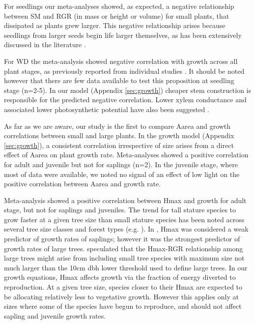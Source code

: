\documentclass[a4paper,11pt]{article}
\begin{document}
For seedlings our meta-analyses showed, as expected, a negative relationship between SM and RGR (in mass or height or volume) for small plants, that dissipated as plants grew larger. This negative relationship arises because seedlings from larger seeds begin life larger themselves, as has been extensively discussed in the literature \citep[reviewed by][]{Turnbull:2012ew}. 

For WD the meta-analysis showed negative correlation with growth across all plant stages, as previously reported from individual studies \citep{Wright:2010tp,Ruger:2012jv}. It should be noted however that there are few data available to test this proposition at seedling stage (n=2-5). In our model (Appendix \ref{sec:growth}) cheaper stem construction is responsible for the predicted negative correlation. Lower xylem conductance and associated lower photosynthetic potential have also been suggested \citep[reviewed by][]{Chave:2009iy}.

As far as we are aware, our study is the first to compare Aarea and growth correlations between small and large plants. In the growth model (Appendix \ref{sec:growth}), a consistent correlation irrespective of size arises from a direct effect of Aarea on plant growth rate. Meta-analyses showed a positive correlation for adult and juvenile but not for saplings (n=2). In the juvenile stage, where most of data were available, we noted no signal of an effect of low light on the positive correlation between Aarea and growth rate.

Meta-analysis showed a positive correlation between Hmax and growth for adult stage, but not for saplings and juveniles. The trend for tall stature species to grow faster at a given tree size than small stature species has been noted across several tree size classes and forest types (e.g. \citealt{Poorter:2008iu,Wright:2010tp,Herault:2011dd,Ruger:2012jv,Iida:2014ep}). In \citet{Wright:2010tp}, Hmax was considered a weak predictor of growth rates of saplings; however it was the strongest predictor of growth rates of large trees. \citet{Poorter:2008iu} speculated that the Hmax-RGR relationship among large trees might arise from including small tree species with maximum size not much larger than the  10cm dbh lower threshold used to define large trees. In our growth equations, Hmax affects growth via the fraction of energy diverted to reproduction. At a given tree size, species closer to their Hmax are expected to be allocating relatively less to vegetative growth. However this applies only at sizes where some of the species have begun to reproduce, and should not affect sapling and juvenile growth rates.
\end{document}
